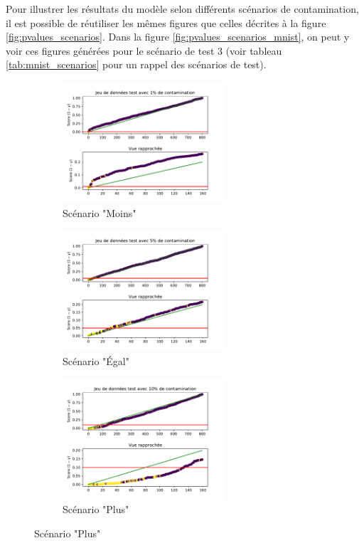 Pour illustrer les résultats du modèle selon différents scénarios de contamination, il est possible de réutiliser les mêmes figures que celles décrites à la figure \ref{fig:pvalues_scenarios}. Dans la figure \ref{fig:pvalues_scenarios_mnist}, on peut y voir ces figures générées pour le scénario de test 3 (voir tableau \ref{tab:mnist_scenarios} pour un rappel des scénarios de test).

\begin{figure}[H]
	\centering
	\begin{subfigure}{6cm}
		\centering\includegraphics[width=6cm]{images/images_davae/pvalues_scenario3_moins}
		\caption{Scénario "Moins"}
	\end{subfigure}
	\begin{subfigure}{6cm}
		\centering\includegraphics[width=6cm]{images/images_davae/pvalues_scenario3_egal}
		\caption{Scénario "Égal"}
	\end{subfigure}
	\begin{subfigure}{6cm}
		\centering\includegraphics[width=6cm]{images/images_davae/pvalues_scenario3_plus}
		\caption{Scénario "Plus"}
	\end{subfigure}

\end{figure}

